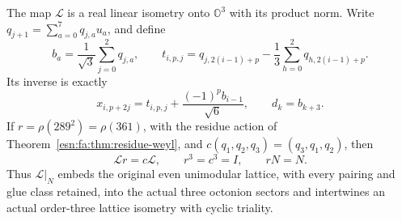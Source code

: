 \begin{theorem}
\label{n24:thm:full-isometry}
The map \(\mathcal L\) is a real linear isometry onto
\(\mathbb O^3\) with its product norm.  Write
\(q_{j+1}=\sum_{a=0}^7q_{j,a}u_a\), and define
\begin{equation}
 b_a=\frac1{\sqrt3}\sum_{j=0}^2q_{j,a},\qquad
 t_{i,p,j}=q_{j,2(i-1)+p}
                    -\frac13\sum_{h=0}^2q_{h,2(i-1)+p}.
 \label{n24:eq:inverse-first}
\end{equation}
Its inverse is exactly
\begin{equation}
 x_{i,p+2j}=t_{i,p,j}+
                 \frac{(-1)^p b_{i-1}}{\sqrt6},
 \qquad d_k=b_{k+3}.
 \label{n24:eq:inverse-second}
\end{equation}
If \(r=\rho(289^2)=\rho(361)\), with the residue action
of Theorem~\ref{esn:fa:thm:residue-weyl}, and
\(c(q_1,q_2,q_3)=(q_3,q_1,q_2)\), then
\begin{equation}
 \mathcal Lr=c\mathcal L,\qquad r^3=c^3=I,
 \qquad rN=N.
 \label{n24:eq:cyclic-intertwining}
\end{equation}
Thus \(\mathcal L|_N\) embeds the original even unimodular lattice,
with every pairing and glue class retained, into the actual three
octonion sectors and intertwines an actual order-three lattice
isometry with cyclic triality.
\end{theorem}

